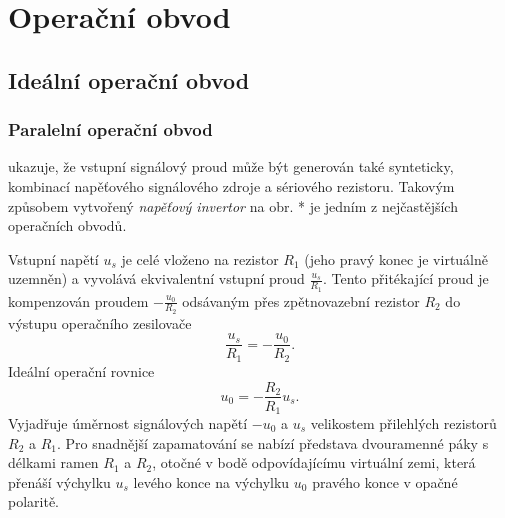 \setchaptertoc
\chapter{Operační obvod}\label{aesIchIV}    
  \section{Ideální operační obvod}\label{aesIchIVsecI}
    \subsection{Paralelní operační obvod}
       ukazuje, že vstupní signálový proud může být generován také 
      synteticky, kombinací napěťového signálového zdroje a sériového rezistoru. Takovým způsobem 
      vytvořený \emph{napěťový invertor} na obr. * je jedním z nejčastějších operačních obvodů. 
      
      Vstupní napětí $u_s$ je celé vloženo na rezistor $R_1$ (jeho pravý konec je virtuálně 
      uzemněn) a vyvolává ekvivalentní vstupní proud $\frac{u_s}{R_1}$. Tento přitékající proud je 
      kompenzován proudem $-\frac{u_0}{R_2}$ odsávaným přes zpětnovazební rezistor $R_2$ do výstupu 
      operačního zesilovače $$\frac{u_s}{R_1}=-\frac{u_0}{R_2}.$$ Ideální operační rovnice
      \begin{equation}\label{AES:eq_opamp_inv02}
        u_0 = - \frac{R_2}{R_1}u_s.
      \end{equation}
      Vyjadřuje úměrnost signálových napětí $-u_0$ a $u_s$ velikostem přilehlých rezistorů $R_2$ a 
      $R_1$. Pro snadnější zapamatování se nabízí představa dvouramenné páky s délkami ramen $R_1$ 
      a $R_2$, otočné v bodě odpovídajícímu virtuální zemi, která přenáší výchylku $u_s$ levého 
      konce na výchylku $u_0$ pravého konce v opačné polaritě.

